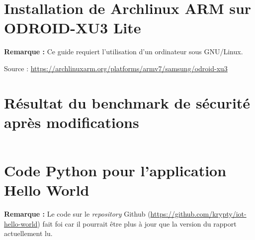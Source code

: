 \documentclass[11pt,a4paper,oneside]{report}
\newcommand{\odroid}{ODROID-XU3 Lite }
\begin{document}
\nocite{*} %



\begin{appendices}

\chapter{Installation de Archlinux ARM sur \odroid}\label{install_alarm_odroid}
\textbf{Remarque : }Ce guide requiert l'utilisation d'un ordinateur sous GNU/Linux.

Source : \url{https://archlinuxarm.org/platforms/armv7/samsung/odroid-xu3}




\chapter{Résultat du benchmark de sécurité après modifications}\label{apx-bench-after-modif}

\inputminted[xleftmargin=20pt, linenos=true, breaklines=true, frame=single, framesep=6pt, tabsize=2, fontfamily=courier, fontsize=\small]{text}{../../docker_security_benchmark/after-modifications.log}


\chapter{Code Python pour l'application Hello World}\label{apx-code-flask}

\textbf{Remarque :} Le code sur le \textit{repository} Github (\url{https://github.com/krypty/iot-hello-world}) fait foi car il pourrait être plus à jour que la version du rapport actuellement lu.

\inputminted[xleftmargin=20pt, linenos=true, breaklines=true, frame=single, framesep=6pt, tabsize=2, fontfamily=courier, fontsize=\small]{python}{appendices/main.py}

\end{appendices}
\end{document}
